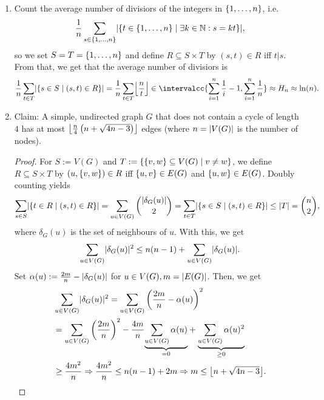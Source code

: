 \documentclass[language=english]{../../Template/TemplateLecture}
\begin{document}
\begin{beispiel}\leavevmode
    \begin{enumerate}[$(i)$]
        \item Count the average number of divisiors of the integers in $\set{1,\ldots,n}$, i.e. 
        \begin{equation}
            \frac{1}{n}\sum_{s \in \set{1,\ldots,n}} \abs{\set{t \in \set{1,\ldots,n}\mid \exists k \in \IN: s = kt}},
        \end{equation}
        so we set $S = T = \set{1,\ldots,n}$ and define $R \subseteq S \times T$ by $(s,t) \in R$ iff $t | s$. From that, we get that the average number of divisiors is 
        \begin{equation}
            \frac{1}{n} \sum_{t \in T} \abs{\set{s \in S \mid (s,t) \in R}} = \frac{1}{n}\sum_{t \in T} \floor*{\frac{n}{t}} \in \intervalcc{\sum_{i = 1}^n \frac{1}{i} - 1, \sum_{i = 1}^n \frac{1}{n}} \approx H_n \approx \ln(n).
        \end{equation}
        \item Claim: A simple, undirected graph $G$ that does not contain a cycle of length $4$ has at most $\floor*{\frac{n}{4}\left(n+\sqrt{4n-3}\right)}$ edges (where $n = \abs{V(G)}$ is the number of nodes).
        \begin{proof}
            For $S := V(G)$ and $T := \set{\set{v,w} \subseteq V(G) \mid v \neq w}$, we define $R \subseteq S \times T$ by $(u,\set{v,w}) \in R$ iff $\set{u,v} \in E(G)$ and $\set{u,w} \in E(G)$. Doubly counting yields 
            \begin{equation*}
                \sum_{s \in S} \abs{\set{t \in R \mid (s,t) \in R}} = \sum_{u \in V(G)}\binom{\abs{\delta_G(u)}}{2} = \sum_{t \in T} \abs{\set{s \in S \mid (s,t) \in R}} \leq \abs{T} = \binom{n}{2},
            \end{equation*}
            where $\delta_G(u)$ is the set of neighbours of $u$. With this, we get 
            \begin{equation}
                \sum_{u \in V(G)} \abs{\delta_G(u)}^2 \leq n(n-1) + \sum_{u \in V(G)}\abs{\delta_G(u)}.
            \end{equation}
            Set $\alpha(u) := \frac{2m}{n} - \abs{\delta_G(u)}$ for $u \in V(G), m = \abs{E(G)}$. Then, we get
            \begin{equation}
                \begin{split}
                    &\sum_{u \in V(G)} \abs{\delta_G(u)}^2 = \sum_{u \in V(G)} \left(\frac{2m}{n} - \alpha(u)\right)^2 \\
                    &= \sum_{u \in V(G)} \left(\frac{2m}{n}\right)^2 - \frac{4m}{n}\underset{=0}{\underbrace{\sum_{u \in V(G)} \alpha(u)}} + \underset{\geq 0}{\underbrace{\sum_{u \in V(G)} \alpha(u)^2}} \\
                    &\geq \frac{4m^2}{n} \Rightarrow \frac{4m^2}{n} \leq n(n-1) + 2m \Rightarrow m \leq \floor*{n + \sqrt{4n-3}}.
                \end{split}
            \end{equation}
        \end{proof}
    \end{enumerate}
\end{beispiel}
\end{document}
